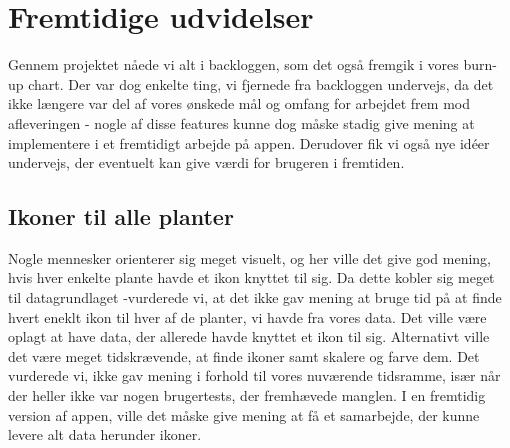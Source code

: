 \section{Fremtidige udvidelser}
Gennem projektet nåede vi alt i backloggen, som det også fremgik i vores burn-up chart. Der var dog enkelte ting, vi fjernede fra backloggen undervejs, da det ikke længere var del af vores ønskede mål og omfang for arbejdet frem mod afleveringen - nogle af disse features kunne dog måske stadig give mening at implementere i et fremtidigt arbejde på appen. Derudover fik vi også nye idéer undervejs, der eventuelt kan give værdi for brugeren i fremtiden.

\subsection{Ikoner til alle planter}
Nogle mennesker orienterer sig meget visuelt, og her ville det give god mening, hvis hver enkelte plante havde et ikon knyttet til sig. Da dette kobler sig meget til datagrundlaget -vurderede vi, at det ikke gav mening at bruge tid på at finde hvert eneklt ikon til hver af de planter, vi havde fra vores data. Det ville være oplagt at have data, der allerede havde knyttet et ikon til sig. Alternativt ville det være meget tidskrævende, at finde ikoner samt skalere og farve dem. Det vurderede vi, ikke gav mening i forhold til vores nuværende tidsramme, især når der heller ikke var nogen brugertests, der fremhævede manglen. I en fremtidig version af appen, ville det måske give mening at få et samarbejde, der kunne levere alt data herunder ikoner. 
